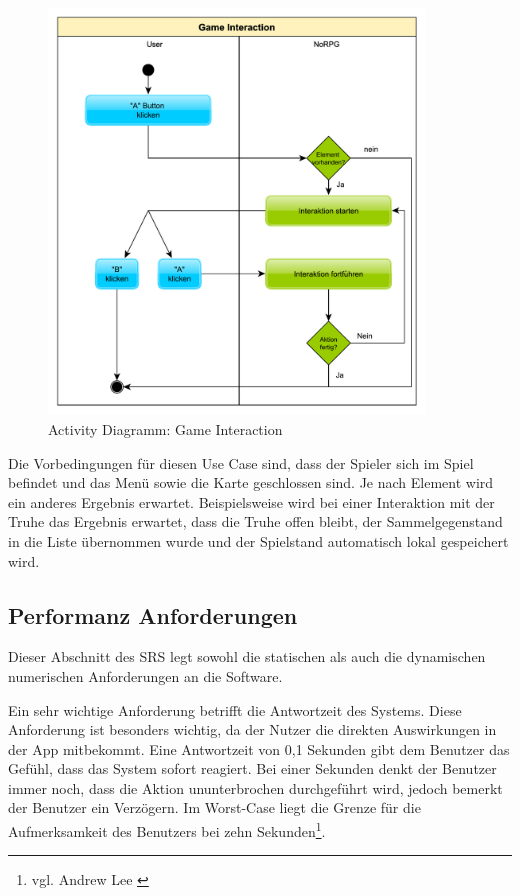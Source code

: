 			\begin{figure}[htbp]
				\centering 
				\label{umlInteraction}
				\includegraphics[width=10cm]{pics/GameInteraction.pdf}
				\caption{Activity Diagramm: Game Interaction}
			\end{figure}
			
			Die Vorbedingungen für diesen Use Case sind, dass der Spieler sich im Spiel befindet und das Menü sowie die Karte geschlossen sind. Je nach Element wird ein anderes Ergebnis erwartet. Beispielsweise wird bei einer Interaktion mit der Truhe das Ergebnis erwartet, dass die Truhe offen bleibt, der Sammelgegenstand in die Liste übernommen wurde und der Spielstand automatisch lokal gespeichert wird.
	
	\subsection{Performanz Anforderungen}
		Dieser Abschnitt des SRS legt sowohl die statischen als auch die dynamischen numerischen Anforderungen an die Software. 
	
		Ein sehr wichtige Anforderung betrifft die Antwortzeit des Systems. Diese Anforderung ist besonders wichtig, da der Nutzer die direkten Auswirkungen in der App mitbekommt. Eine Antwortzeit von 0,1 Sekunden gibt dem Benutzer das Gefühl, dass das System sofort reagiert. Bei einer Sekunden denkt der Benutzer immer noch, dass die Aktion ununterbrochen durchgeführt wird, jedoch bemerkt der Benutzer ein Verzögern. Im Worst-Case liegt die Grenze für die Aufmerksamkeit des Benutzers bei zehn Sekunden\footnote{vgl. Andrew Lee \cite{performance1}}.
		
